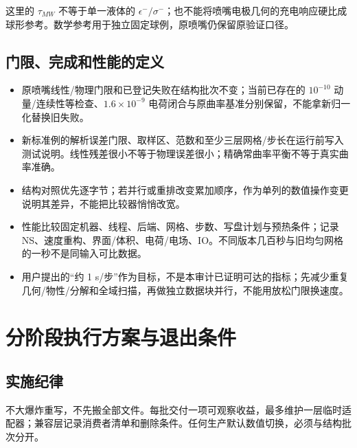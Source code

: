 \documentclass[UTF8,a4paper,11pt,fontset=fandol]{ctexart}
\numberwithin{equation}{section}
\begin{document}
这里的 $\tau_{MW}$ 不等于单一液体的 $\epsilon^-/\sigma^-$；也不能将喷嘴电极几何的充电响应硬比成球形参考。数学参考用于独立固定球例，原喷嘴仍保留原验证口径。

\subsection{门限、完成和性能的定义}
\begin{itemize}
\item 原喷嘴线性/物理门限和已登记失败在结构批次不变；当前已存在的 $10^{-10}$ 动量/连续性等检查、$1.6\times10^{-9}$ 电荷闭合与原曲率基准分别保留，不能拿新归一化替换旧失败。
\item 新标准例的解析误差门限、取样区、范数和至少三层网格/步长在运行前写入测试说明。线性残差很小不等于物理误差很小；精确常曲率平衡不等于真实曲率准确。
\item 结构对照优先逐字节；若并行或重排改变累加顺序，作为单列的数值操作变更说明其差异，不能把比较器悄悄改宽。
\item 性能比较固定机器、线程、后端、网格、步数、写盘计划与预热条件；记录 NS、速度重构、界面/体积、电荷/电场、IO。不同版本几百秒与旧均匀网格的一秒不是同输入可比数据。
\item 用户提出的“约 1 s/步”作为目标，不是本审计已证明可达的指标；先减少重复几何/物性/分解和全域扫描，再做独立数据块并行，不能用放松门限换速度。
\end{itemize}

\section{分阶段执行方案与退出条件}\label{sec:plan}
\subsection{实施纪律}
不大爆炸重写，不先搬全部文件。每批交付一项可观察收益，最多维护一层临时适配器；兼容层记录消费者清单和删除条件。任何生产默认数值切换，必须与结构批次分开。
\end{document}

